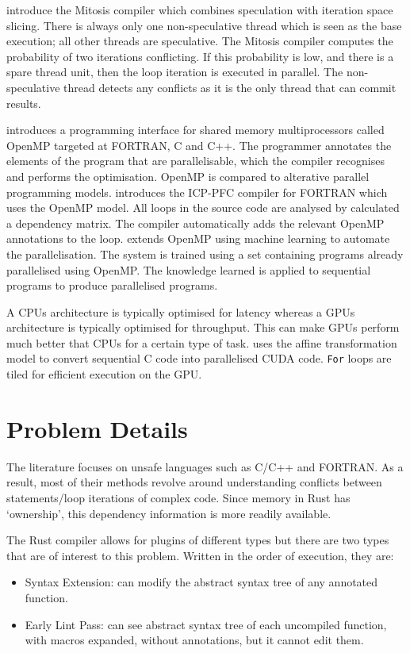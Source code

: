 \documentclass[conference]{IEEEtran}
\begin{document}
\textcite{Quinones2005} introduce the Mitosis compiler which combines speculation with iteration space slicing. There is always only one non-speculative thread which is seen as the base execution; all other threads are speculative. The Mitosis compiler computes the probability of two iterations conflicting. If this probability is low, and there is a spare thread unit, then the loop iteration is executed in parallel. The non-speculative thread detects any conflicts as it is the only thread that can commit results.

\textcite{Dagum1998} introduces a programming interface for shared memory multiprocessors called OpenMP targeted at FORTRAN, C and C++. The programmer annotates the elements of the program that are parallelisable, which the compiler recognises and performs the optimisation. OpenMP is compared to alterative parallel programming models.
\textcite{Kim2000} introduces the ICP-PFC compiler for FORTRAN which uses the OpenMP model. All loops in the source code are analysed by calculated a dependency matrix. The compiler automatically adds the relevant OpenMP annotations to the loop.
\textcite{Lam2011} extends OpenMP using machine learning to automate the parallelisation. The system is trained using a set containing programs already parallelised using OpenMP. The knowledge learned is applied to sequential programs to produce parallelised programs.

A CPUs architecture is typically optimised for latency whereas a GPUs architecture is typically optimised for throughput. This can make GPUs perform much better that CPUs for a certain type of task. \textcite{Baskaran2010} uses the affine transformation model to convert sequential C code into parallelised CUDA code. \texttt{For} loops are tiled for efficient execution on the GPU.

\section{Problem Details}
\label{sec:problem-details}
The literature focuses on unsafe languages such as C/C++ and FORTRAN. As a result, most of their methods revolve around understanding conflicts between statements/loop iterations of complex code. Since memory in Rust has `ownership', this dependency information is more readily available.

The Rust compiler allows for plugins of different types but there are two types that are of interest to this problem. Written in the order of execution, they are:
\begin{itemize}
    \item Syntax Extension: can modify the abstract syntax tree of any annotated function.
    \item Early Lint Pass: can see abstract syntax tree of each uncompiled function, with macros expanded, without annotations, but it cannot edit them.
\end{itemize}
\end{document}

